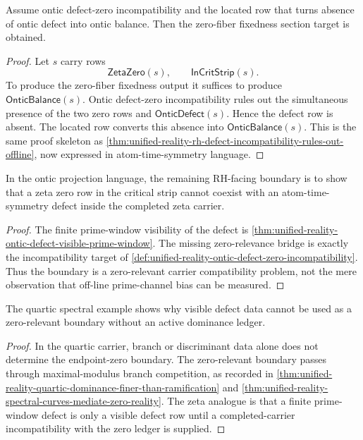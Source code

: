 \begin{theorem}
\label{thm:unified-reality-ontic-incompatibility-closes-section-target}
Assume ontic defect-zero incompatibility and the located row that turns
absence of ontic defect into ontic balance. Then the zero-fiber
fixedness section target is obtained.
\end{theorem}

\begin{proof}
Let $s$ carry rows
$$
\mathsf{ZetaZero}(s),
\qquad
\mathsf{InCritStrip}(s).
$$
To produce the zero-fiber fixedness output it suffices to produce
$\mathsf{OnticBalance}(s)$. Ontic defect-zero incompatibility rules out
the simultaneous presence of the two zero rows and
$\mathsf{OnticDefect}(s)$. Hence the defect row is absent. The located
row converts this absence into $\mathsf{OnticBalance}(s)$. This is the
same proof skeleton as
\autoref{thm:unified-reality-rh-defect-incompatibility-rules-out-offline},
now expressed in atom-time-symmetry language.
\end{proof}

\begin{corollary}
\label{cor:unified-reality-remaining-ontic-boundary}
In the ontic projection language, the remaining RH-facing boundary is to
show that a zeta zero row in the critical strip cannot coexist with an
atom-time-symmetry defect inside the completed zeta carrier.
\end{corollary}

\begin{proof}
The finite prime-window visibility of the defect is
\autoref{thm:unified-reality-ontic-defect-visible-prime-window}. The
missing zero-relevance bridge is exactly the incompatibility target of
\autoref{def:unified-reality-ontic-defect-zero-incompatibility}. Thus
the boundary is a zero-relevant carrier compatibility problem, not the
mere observation that off-line prime-channel bias can be measured.
\end{proof}

\begin{theorem}
\label{thm:unified-reality-spectral-dominance-warns-defect-collapse}
The quartic spectral example shows why visible defect data cannot be
used as a zero-relevant boundary without an active dominance ledger.
\end{theorem}

\begin{proof}
In the quartic carrier, branch or discriminant data alone does not
determine the endpoint-zero boundary. The zero-relevant boundary passes
through maximal-modulus branch competition, as recorded in
\autoref{thm:unified-reality-quartic-dominance-finer-than-ramification}
and
\autoref{thm:unified-reality-spectral-curves-mediate-zero-reality}. The
zeta analogue is that a finite prime-window defect is only a visible
defect row until a completed-carrier incompatibility with the zero ledger
is supplied.
\end{proof}

